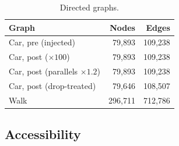 \documentclass[a4paper,fleqn]{cas-dc}
\begin{document}
\begin{table}[!htbp]
\centering
\small
\caption{Directed graphs.}
\label{tab:graphs}
\setlength{\tabcolsep}{3pt}
\begin{tabular}{@{}lrr@{}}
\toprule
Graph & Nodes & Edges \\
\midrule
Car, pre (injected) & 79{,}893 & 109{,}238 \\
Car, post ($\times 100$) & 79{,}893 & 109{,}238 \\
Car, post (parallels $\times 1.2$) & 79{,}893 & 109{,}238 \\
Car, post (drop-treated) & 79{,}646 & 108{,}507 \\
Walk & 296{,}711 & 712{,}786 \\
\bottomrule
\end{tabular}
\end{table}

\subsection{Accessibility}
\end{document}
